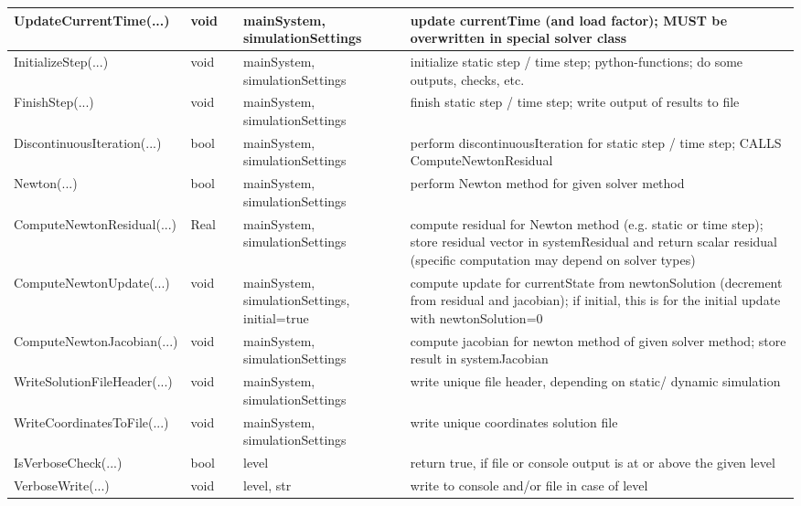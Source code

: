 \begin{center}
\begin{longtable}{| p{4.2cm} | p{2.5cm} | p{0.3cm} | p{3.0cm} | p{6cm} |}
    UpdateCurrentTime(...) &     void &      &     mainSystem, simulationSettings &     update currentTime (and load factor); MUST be overwritten in special solver class\\ \hline
    InitializeStep(...) &     void &      &     mainSystem, simulationSettings &     initialize static step / time step; python-functions; do some outputs, checks, etc.\\ \hline
    FinishStep(...) &     void &      &     mainSystem, simulationSettings &     finish static step / time step; write output of results to file\\ \hline
    DiscontinuousIteration(...) &     bool &      &     mainSystem, simulationSettings &     perform discontinuousIteration for static step / time step; CALLS ComputeNewtonResidual\\ \hline
    Newton(...) &     bool &      &     mainSystem, simulationSettings &     perform Newton method for given solver method\\ \hline
    ComputeNewtonResidual(...) &     Real &      &     mainSystem, simulationSettings &     compute residual for Newton method (e.g. static or time step); store residual vector in systemResidual and return scalar residual (specific computation may depend on solver types)\\ \hline
    ComputeNewtonUpdate(...) &     void &      &     mainSystem, simulationSettings, initial=true &     compute update for currentState from newtonSolution (decrement from residual and jacobian); if initial, this is for the initial update with newtonSolution=0\\ \hline
    ComputeNewtonJacobian(...) &     void &      &     mainSystem, simulationSettings &     compute jacobian for newton method of given solver method; store result in systemJacobian\\ \hline
    WriteSolutionFileHeader(...) &     void &      &     mainSystem, simulationSettings &     write unique file header, depending on static/ dynamic simulation\\ \hline
    WriteCoordinatesToFile(...) &     void &      &     mainSystem, simulationSettings &     write unique coordinates solution file\\ \hline
    IsVerboseCheck(...) &     bool &      &     level &     return true, if file or console output is at or above the given level\\ \hline
    VerboseWrite(...) &     void &      &     level, str &     write to console and/or file in case of level\\ \hline

\end{longtable}
\end{center}
